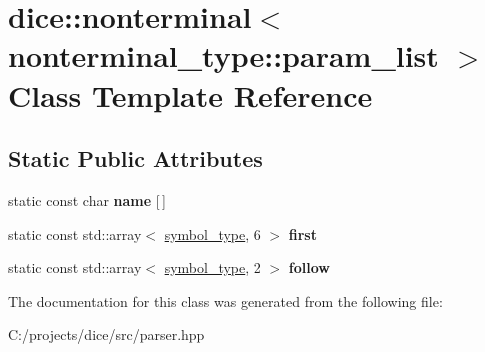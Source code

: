 \hypertarget{classdice_1_1nonterminal_3_01nonterminal__type_1_1param__list_01_4}{}\section{dice\+:\+:nonterminal$<$ nonterminal\+\_\+type\+:\+:param\+\_\+list $>$ Class Template Reference}
\label{classdice_1_1nonterminal_3_01nonterminal__type_1_1param__list_01_4}
\subsection*{Static Public Attributes}
\begin{DoxyCompactItemize}
\item 
\mbox{\label{classdice_1_1nonterminal_3_01nonterminal__type_1_1param__list_01_4_a8244706e04083632e32f04450c1df6ab}} 
static const char {\bfseries name} \mbox{[}$\,$\mbox{]}
\item 
\mbox{\label{classdice_1_1nonterminal_3_01nonterminal__type_1_1param__list_01_4_a2883b61ba83ba16df71aea6810d72f27}} 
static const std\+::array$<$ \mbox{\hyperlink{symbols_8hpp_ab0295a855bb7eadc138abd6993af3aea}{symbol\+\_\+type}}, 6 $>$ {\bfseries first}
\item 
\mbox{\label{classdice_1_1nonterminal_3_01nonterminal__type_1_1param__list_01_4_a9c561cf8eb727314cd97cfe9e9fbd511}} 
static const std\+::array$<$ \mbox{\hyperlink{symbols_8hpp_ab0295a855bb7eadc138abd6993af3aea}{symbol\+\_\+type}}, 2 $>$ {\bfseries follow}
\end{DoxyCompactItemize}


The documentation for this class was generated from the following file\+:\begin{DoxyCompactItemize}
\item 
C\+:/projects/dice/src/parser.\+hpp\end{DoxyCompactItemize}
